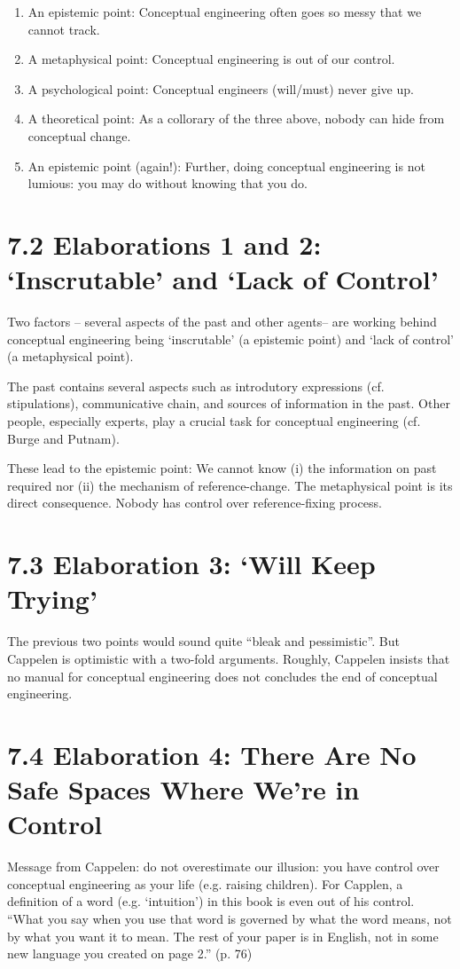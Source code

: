 \documentclass[
10pt, %
a4paper, %
twocolumn, %
landscape %
]{article}
\begin{document}
\begin{enumerate}
  \item An epistemic point: Conceptual engineering often goes so messy that we cannot track.
  \item A metaphysical point: Conceptual engineering is out of our control.
  \item A psychological point: Conceptual engineers (will/must) never give up.
  \item A theoretical point: As a collorary of the three above, nobody can hide from conceptual change.
  \item An epistemic point (again!): Further, doing conceptual engineering is not lumious: you may do without knowing that you do.
\end{enumerate}

\section*{7.2 Elaborations 1 and 2: `Inscrutable' and `Lack of Control'}

Two factors -- several aspects of the past and other agents-- are working behind conceptual engineering being `inscrutable' (a epistemic point) and `lack of control' (a metaphysical point).

The past contains several aspects such as introdutory expressions (cf. stipulations), communicative chain, and sources of information in the past.
Other people, especially experts, play a crucial task for conceptual engineering (cf. Burge and Putnam).

These lead to the epistemic point: We cannot know (i) the information on past required nor (ii) the mechanism of reference-change.
The metaphysical point is its direct consequence. Nobody has control over reference-fixing process.



\section*{7.3 Elaboration 3: `Will Keep Trying'}
The previous two points would sound quite ``bleak and pessimistic''. But Cappelen is optimistic with a two-fold arguments.
Roughly, Cappelen insists that no manual for conceptual engineering does not concludes the end of conceptual engineering.

\section*{7.4 Elaboration 4: There Are No Safe Spaces Where We're in Control}
Message from Cappelen: do not overestimate our illusion: you have control over conceptual engineering as your life  (e.g. raising children).
For Capplen, a definition of a word (e.g. `intuition') in this book is even out of his control.
``What you say when you use that word is governed by what the word means, not by what you want it to mean. The rest of your paper is in English, not in some new language you created on page 2.'' (p. 76)
\end{document}
